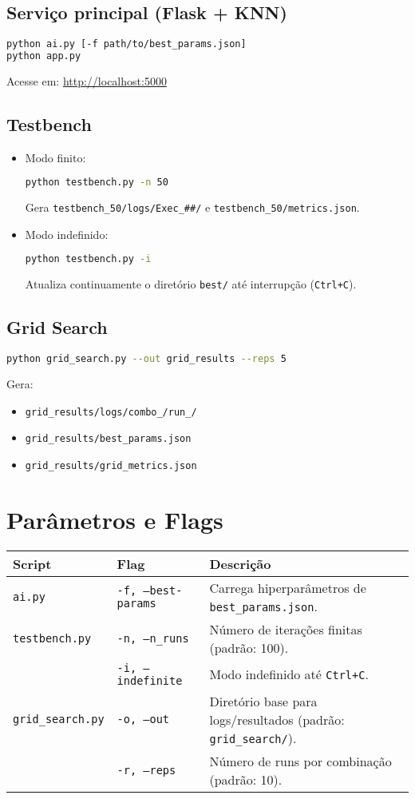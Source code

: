 \documentclass[a4paper,12pt]{article}
\begin{document}
\subsection*{Serviço principal (Flask + KNN)}
\begin{lstlisting}[language=bash]
python ai.py [-f path/to/best_params.json]
python app.py
\end{lstlisting}
Acesse em: \url{http://localhost:5000}

\subsection*{Testbench}
\begin{itemize}
  \item Modo finito:
    \begin{lstlisting}[language=bash]
python testbench.py -n 50
    \end{lstlisting}
    Gera \texttt{testbench\_50/logs/Exec\_\#\#/} e \texttt{testbench\_50/metrics.json}.
  \item Modo indefinido:
    \begin{lstlisting}[language=bash]
python testbench.py -i
    \end{lstlisting}
    Atualiza continuamente o diretório \texttt{best/} até interrupção (\texttt{Ctrl+C}).
\end{itemize}

\subsection*{Grid Search}
\begin{lstlisting}[language=bash]
python grid_search.py --out grid_results --reps 5
\end{lstlisting}
Gera:
\begin{itemize}
  \item \texttt{grid\_results/logs/combo\_/run\_/}
  \item \texttt{grid\_results/best\_params.json}
  \item \texttt{grid\_results/grid\_metrics.json}
\end{itemize}

\section*{Parâmetros e Flags}
\begin{tabular}{p{4cm} p{4cm} p{6cm}}
\hline
\textbf{Script} & \textbf{Flag} & \textbf{Descrição} \\
\hline
\texttt{ai.py} & \texttt{-f, --best-params} & Carrega hiperparâmetros de \texttt{best\_params.json}. \\
\texttt{testbench.py} & \texttt{-n, --n\_runs} & Número de iterações finitas (padrão: 100). \\
 & \texttt{-i, --indefinite} & Modo indefinido até \texttt{Ctrl+C}. \\
\texttt{grid\_search.py} & \texttt{-o, --out} & Diretório base para logs/resultados (padrão: \texttt{grid\_search/}). \\
 & \texttt{-r, --reps} & Número de runs por combinação (padrão: 10). \\
\hline
\end{tabular}
\end{document}
